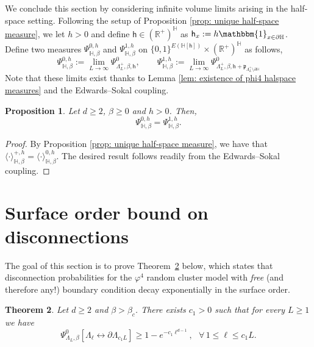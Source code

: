 \documentclass[11pt,a4paper]{article}
\newtheorem{theorem}{Theorem}[section]
\newtheorem{proposition}[theorem]{Proposition}
\theoremstyle{definition}
\numberwithin{equation}{section}
\begin{document}
We conclude this section by considering infinite volume limits arising in the half-space setting. Following the setup of Proposition \ref{prop: unique half-space measure}, we let $h>0$ and define $\mathsf{h}\in(\mathbb R^+)^{\mathbb H}$ as $\mathsf{h}_x:=h\mathbbm{1}_{x\in \partial \mathbb H}$.
Define two measures $\Psi^{0,h}_{\mathbb H,\beta}$ and $\Psi^{1,h}_{\mathbb H,\beta}$ on $\{0,1\}^{E(\mathbb H[\mathsf{h}])}\times (\mathbb R^+)^{\mathbb H}$ as follows,
\begin{equation}
    \Psi^{0,h}_{\mathbb H,\beta}:=\lim_{L\rightarrow \infty}\Psi^{0}_{\Lambda_L^+,\beta,\mathsf{h}}, \qquad \Psi^{1,h}_{\mathbb H,\beta}:=\lim_{L\rightarrow \infty}\Psi^{0}_{\Lambda_L^+,\beta,\mathsf{h}+\mathfrak{p}_{\Lambda_L^+\setminus \partial \mathbb H}}
\end{equation}
Note that these limits exist thanks to Lemma \ref{lem: existence of phi4 halspace measures} and the Edwards--Sokal coupling.

\begin{proposition}\label{prop: equality half space random cluster measures} Let $d\geq 2$, $\beta\geq 0$ and $h>0$. Then,
\begin{equation}
    \Psi^{0,h}_{\mathbb H,\beta}=\Psi^{1,h}_{\mathbb H,\beta}.
\end{equation}
\end{proposition}

\begin{proof} By Proposition \ref{prop: unique half-space measure}, we have that $\langle \cdot\rangle^{+,h}_{\mathbb H,\beta}=\langle \cdot\rangle^{0,h}_{\mathbb H,\beta}$. The desired result follows readily from the Edwards--Sokal coupling.
\end{proof}



\section{Surface order bound on disconnections}\label{sec:surface_tension}


The goal of this section is to prove Theorem~\ref{thm:free_surface_tension} below, which states that disconnection probabilities for the $\varphi^4$ random cluster model with \emph{free} (and therefore any!) boundary condition decay exponentially in the surface order.

\begin{theorem}\label{thm:free_surface_tension}
Let $d\geq2$ and $\beta>\beta_c$. There exists $c_1>0$ such that for every $L\geq 1$ we have
\begin{equation}\label{eq:surface_free_box}
        \Psi^0_{\Lambda_{L},\beta}[\Lambda_\ell\longleftrightarrow \partial \Lambda_{c_1 L}]\geq 1-e^{-c_1 \ell^{d-1}}, ~~~ \forall\, 1\leq \ell\leq c_1 L.
    \end{equation}
\end{theorem}
\end{document}
